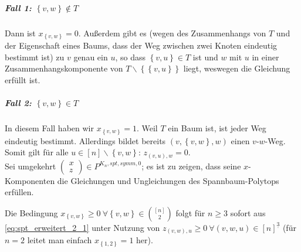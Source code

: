 \documentclass[10p,a4paper,BCOR = 12mm, DIV=15]{scrbook}
\begin{document}
\begin{bew}
\subparagraph{Fall 1: $\left\{v, w\right\}\notin T$} Dann ist $x_{\left\{v, w\right\}}=0$. Außerdem gibt es (wegen des Zusammenhangs von $T$ und der Eigenschaft eines Baums, dass der Weg zwischen zwei Knoten eindeutig bestimmt ist) zu $v$ genau ein $u$, so dass $\left\{v, u\right\}\in T$ ist und $w$ mit $u$ in einer Zusammenhangskomponente von $T\backslash \left\{\left\{v, u\right\}\right\}$ liegt, weswegen die Gleichung erfüllt ist.

\subparagraph{Fall 2: $\left\{v, w\right\}\in T$} In diesem Fall haben wir $x_{\left\{v, w\right\}}=1$. Weil $T$ ein Baum ist, ist jeder Weg eindeutig bestimmt. Allerdings bildet bereits $\left(v, \left\{v, w\right\}, w\right)$ einen $v$-$w$-Weg. Somit gilt für alle $u\in \left[n\right]\backslash \left\{v, w\right\}$: $z_{(v, u), w}=0$.
\\

Sei umgekehrt $\left(
\begin{array}{c}
x \\
z
\end{array}\right) \in P^{K_n, spt, symm, 0}$; es ist zu zeigen, dass seine $x$-Komponenten die Gleichungen und Ungleichungen des Spannbaum-Polytops erfüllen.

Die Bedingung $x_{\left\{v, w\right\}} \geq 0 \ \forall \left\{v, w\right\} \in {\left[n\right] \choose 2}$ folgt für $n\geq 3$ sofort aus \eqref{eq:spt_erweitert_2_1} unter Nutzung von $z_{\left(v, w\right), u} \geq 0 \ \forall \left(v, w, u\right) \in \left[n\right]^{\underline{3}}$ (für $n=2$ leitet man einfach $x_{\left\{1, 2\right\}} = 1$ her).


\end{bew}
\end{document}
